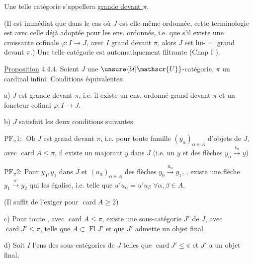 
Une telle catégorie s'appellera \uline{grande devant $\pi$}.

(Il est immédiat que dans le cas où $J$ est elle-même ordonnée, cette terminologie est  avec celle déjà adoptée pour les ens. ordonnés, i.e. que s'il existe une  croissante cofinale $\varphi:I\longrightarrow J$, avec $I$ grand devant $\pi$, alors $J$ est lui-$=$ grand devant $\pi$.) Une telle catégorie est automatiquement filtrante (Chap I ).

\uline{Proposition} 4.4.4. Soient $J$ une $\unsure{\mathcal{U}|\mathscr{U}}$-catégorie,  $\pi$ un cardinal infini. Conditions équivalentes:

a) $J$ est grande devant $\pi$, i.e. il existe un ens. ordonné grand devant $\pi$ et un foncteur cofinal $\varphi:I\longrightarrow J$.

b) $J$ satisfait les deux conditions suivantes

$\mathrm{PF}_{\pi}1$: $\operatorname{Ob}J$ est grand devant $\pi$, i.e. pour toute famille $(y_{\alpha})_{\alpha\in A}$ d'objets de $J$, avec $\operatorname{card}A\leq\pi$, il existe un majorant $y$ dans $J$ (i.e. un $y$ et des flèches $y_{\alpha}\xrightarrow{v_{\alpha}}y$)

$\mathrm{PF}_{\pi}2$: Pour $y_0,y_1$ dans $J$ et    $(u_{\alpha})_{\alpha\in A}$ des flèches $y_0\xrightarrow{u_{\alpha}}y_1$, , existe une flèche $y_1\xrightarrow{u'}y_2$ qui les égalise, i.e. telle que $u'u_{\alpha}=u'u_{\beta}$ $\forall\alpha,\beta\in A$.

(Il suffit de l'exiger pour $\operatorname{card}A\geq2$)


c) Pour toute  , avec $\operatorname{card}A\leq\pi$, existe une sous-catégorie $J'$ de $J$, avec $\operatorname{card}J'\leq\pi$, telle que $A\subset\operatorname{Fl}J'$ et que $J'$ admette un objet final.

d) Soit $I$ l'ens des sous-catégories  de $J$ telles que $\operatorname{card}J'\leq\pi$ et $J'$ a un objet final,
